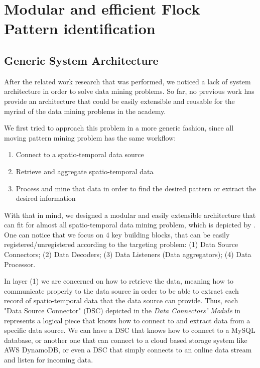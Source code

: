\chapter{Modular and efficient Flock Pattern identification}
\label{chp:solution}
\section{Generic System Architecture}
\label{sec:architecture}
After the related work research that was performed, we noticed a lack of system architecture in order to solve data
mining problems. So far, no previous work has provide an architecture that could be easily extensible and reusable for
the myriad of the data mining problems in the academy.

We first tried to approach this problem in a more generic fashion, since all moving pattern mining problem has the same
workflow:

\begin{enumerate}
    \item Connect to a spatio-temporal data source
    \item Retrieve and aggregate spatio-temporal data
    \item Process and mine that data in order to find the desired pattern or extract the desired information
\end{enumerate}

With that in mind, we designed a modular and easily extensible architecture that can fit for almost all spatio-temporal
data mining problem, which is depicted by . One can notice that we focus on 4 key building
blocks, that can be easily registered/unregistered according to the targeting problem: (1) Data Source Connectors; (2)
Data Decoders; (3) Data Listeners (Data aggregators); (4) Data Processor.

In layer (1) we are concerned on how to retrieve the data, meaning how to communicate properly to the data source in
order to be able to extract each record of spatio-temporal data that the data source can provide. Thus, each "Data
Source Connector" (DSC) depicted in the \textit{Data Connectors' Module} in  represents a
logical piece that knows how to connect to and extract data from a specific data source. We can have a DSC that knows
how to connect to a MySQL database, or another one that can connect to a cloud based storage system like AWS DynamoDB,
or even a DSC that simply connects to an online data stream and listen for incoming data.

